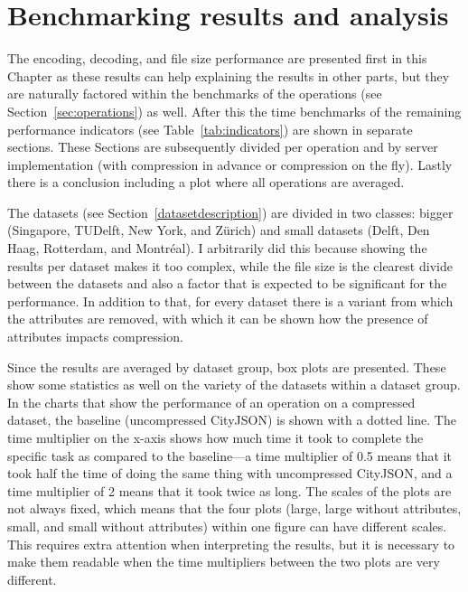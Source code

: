 \chapter{Benchmarking results and analysis}
\label{ch:bmresults}

The encoding, decoding, and file size performance are presented first in this Chapter as these results can help explaining the results in other parts, but they are naturally factored within the benchmarks of the operations (see Section~\ref{sec:operations}) as well.
After this the time benchmarks of the remaining performance indicators (see Table~\ref{tab:indicators}) are shown in separate sections.
These Sections are subsequently divided per operation and by server implementation (with compression in advance or compression on the fly).
Lastly there is a conclusion including a plot where all operations are averaged.


The datasets (see Section~\ref{datasetdescription}) are divided in two classes: bigger (Singapore, TUDelft, New York, and Zürich) and small datasets (Delft, Den Haag, Rotterdam, and Montréal). 
I arbitrarily did this because showing the results per dataset makes it too complex, while the file size is the clearest divide between the datasets and also a factor that is expected to be significant for the performance.
In addition to that, for every dataset there is a variant from which the attributes are removed, with which it can be shown how the presence of attributes impacts compression.

Since the results are averaged by dataset group, box plots are presented.
These show some statistics as well on the variety of the datasets within a dataset group.
In the charts that show the performance of an operation on a compressed dataset, the baseline (uncompressed CityJSON) is shown with a dotted line.
The time multiplier on the x-axis shows how much time it took to complete the specific task as compared to the baseline---a time multiplier of 0.5 means that it took half the time of doing the same thing with uncompressed CityJSON, and a time multiplier of 2 means that it took twice as long.
The scales of the plots are not always fixed, which means that the four plots (large, large without attributes, small, and small without attributes) within one figure can have different scales.
This requires extra attention when interpreting the results, but it is necessary to make them readable when the time multipliers between the two plots are very different.


